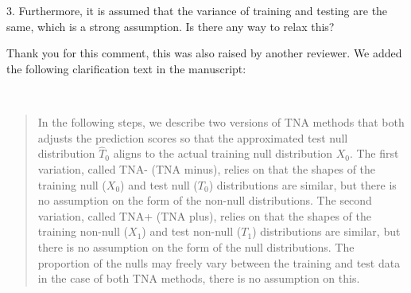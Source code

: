 \documentclass{article}
\newcommand{\response}[1]{\vspace*{1ex} \color{blue} \noindent #1 \color{black}
\vspace*{2ex}}
\newcommand{\edit}[1]{\begin{quotation}\color{red}\noindent #1
\color{black}\end{quotation}}
\begin{document}
%

3. Furthermore, it is assumed that the variance of training and testing are the same, which is a strong assumption. Is there any way to relax this?


\response{Thank you for this comment, this was also raised by another reviewer. We added the following clarification text in the manuscript: }

\ 

\edit{ In the following steps, we describe two versions of TNA methods that both adjusts the prediction scores so that the approximated test null distribution $\hat{T}_0$ aligns to the actual training null distribution $X_0$. The first variation, called TNA- (TNA minus), relies on that the shapes of the training null ($X_0$) and test null ($T_0$) distributions are similar, but there is no assumption on the form of the non-null distributions. The second variation, called TNA+ (TNA plus), relies on that the shapes of the training non-null ($X_1$) and test non-null ($T_1$) distributions are similar, but there is no assumption on the form of the null distributions. The proportion of the nulls may freely vary between the training and test data in the case of both TNA methods, there is no assumption on this.
}
\end{document}
